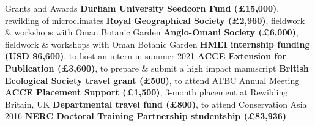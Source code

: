 \begin{rubric}{Grants and Awards}
\entry*[2022] \textbf{Durham University Seedcorn Fund (£15,000)}, rewilding of microclimates
\entry*[2022] \textbf{Royal Geographical Society (£2,960)}, fieldwork \& workshops with Oman Botanic Garden
\entry*[2022] \textbf{Anglo-Omani Society (£6,000)}, fieldwork \& workshops with Oman Botanic Garden
\entry*[2021] \textbf{HMEI internship funding (USD \$6,600)}, to host an intern in summer 2021
\entry*[2018] \textbf{ACCE Extension for Publication (£3,600)}, to prepare \& submit a high impact manuscript
\entry*[2018] \textbf{British Ecological Society travel grant (£500)}, to attend ATBC Annual Meeting
\entry*[2016] \textbf{ACCE Placement Support (£1,500)}, 3-month placement at Rewilding Britain, UK
\entry*[2016] \textbf{Departmental travel fund (£800)}, to attend Conservation Asia 2016
\entry*[2014] \textbf{NERC Doctoral Training Partnership studentship (£83,936)}
\end{rubric}